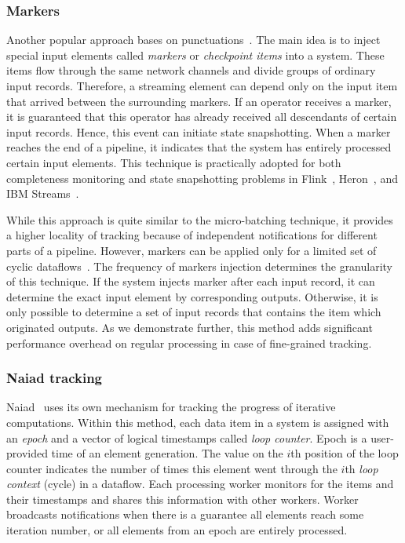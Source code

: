\subsubsection{Markers}

Another popular approach bases on punctuations~\cite{Tucker:2003:EPS:776752.776780}. The main idea is to inject special input elements called {\em markers} or {\em checkpoint items} into a system. These items flow through the same network channels and divide groups of ordinary input records. Therefore, a streaming element can depend only on the input item that arrived between the surrounding markers. If an operator receives a marker, it is guaranteed that this operator has already received all descendants of certain input records. Hence, this event can initiate state snapshotting. When a marker reaches the end of a pipeline, it indicates that the system has entirely processed certain input elements. This technique is practically adopted for both completeness monitoring and state snapshotting problems in Flink~\cite{Carbone:2017:SMA:3137765.3137777}, Heron~\cite{Kulkarni:2015:THS:2723372.2742788}, and IBM Streams~\cite{jacques2016consistent}. 

While this approach is quite similar to the micro-batching technique, it provides a higher locality of tracking because of independent notifications for different parts of a pipeline. However, markers can be applied only for a limited set of cyclic dataflows~\cite{carbone2018scalable}. The frequency of markers injection determines the granularity of this technique. If the system injects marker after each input record, it can determine the exact input element by corresponding outputs. Otherwise, it is only possible to determine a set of input records that contains the item which originated outputs. As we demonstrate further, this method adds significant performance overhead on regular processing in case of fine-grained tracking.

\subsubsection{Naiad tracking}

Naiad~\cite{Murray:2013:NTD:2517349.2522738} uses its own mechanism for tracking the progress of iterative computations. Within this method, each data item in a system is assigned with an {\em epoch} and a vector of logical timestamps called {\em loop counter}. Epoch is a user-provided time of an element generation. The value on the $i$th position of the loop counter indicates the number of times this element went through the $i$th {\em loop context} (cycle) in a dataflow. Each processing worker monitors for the items and their timestamps and shares this information with other workers. Worker broadcasts notifications when there is a guarantee all elements reach some iteration number, or all elements from an epoch are entirely processed.

